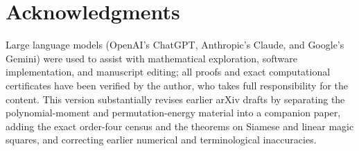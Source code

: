 \section*{Acknowledgments}
\label{sec:ai_statement}

Large language models (OpenAI's ChatGPT, Anthropic's Claude, and Google's Gemini) were used to assist with mathematical exploration, software implementation, and manuscript editing; all proofs and exact computational certificates have been verified by the author, who takes full responsibility for the content. This version substantially revises earlier arXiv drafts by separating the polynomial-moment and permutation-energy material into a companion paper, adding the exact order-four census and the theorems on Siamese and linear magic squares, and correcting earlier numerical and terminological inaccuracies.
